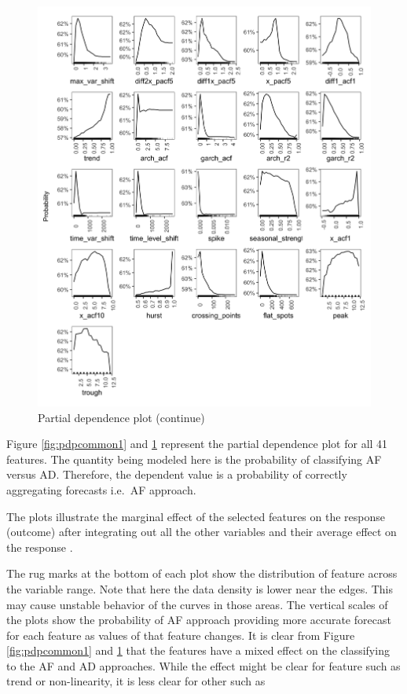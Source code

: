 \documentclass[preprint, 3p,
authoryear]{elsarticle} %
\begin{document}
\begin{figure}[H]

{\centering \includegraphics[width=1\linewidth]{img/300dpi/pfinal1} 

}

\caption{Partial dependence plot (continue)}\label{fig:pdpcommon2}
\end{figure}

Figure \ref{fig:pdpcommon1} and \ref{fig:pdpcommon2} represent the
partial dependence plot for all 41 features. The quantity being modeled
here is the probability of classifying AF versus AD. Therefore, the
dependent value is a probability of correctly aggregating forecasts
i.e.~AF approach.

The plots illustrate the marginal effect of the selected features on the
response (outcome) after integrating out all the other variables and
their average effect on the response \citep{james2013introduction}.

The rug marks at the bottom of each plot show the distribution of
feature across the variable range. Note that here the data density is
lower near the edges. This may cause unstable behavior of the curves in
those areas. The vertical scales of the plots show the probability of AF
approach providing more accurate forecast for each feature as values of
that feature changes. It is clear from Figure \ref{fig:pdpcommon1} and
\ref{fig:pdpcommon2} that the features have a mixed effect on the
classifying to the AF and AD approaches. While the effect might be clear
for feature such as trend or non-linearity, it is less clear for other
such as
\end{document}
